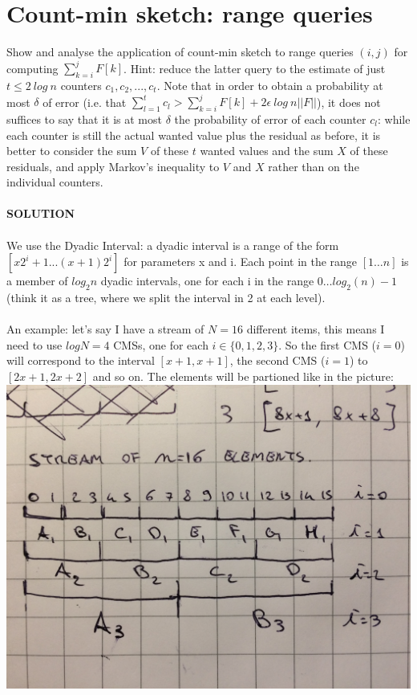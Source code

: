 \documentclass[a4paper]{article}
\begin{document}
\section*{Count-min sketch: range queries}
Show and analyse the application of count-min sketch to range queries $(i,j)$ for computing  $\sum^j_{k=i} F[k]$. Hint: reduce the latter query to the estimate of just $t \leq 2\ log\ n$ counters $c_1,c_2,...,c_t$. Note that in order to obtain a probability at most $\delta$ of error (i.e. that $\sum^t_{l=1}c_l > \sum^j_{k=i}F[k] + 2\epsilon\ log\ n ||F||$), it does not suffices to say that it is at most $\delta$ the probability of error of each counter $c_l$: while each counter is still the actual wanted value plus the residual as before, it is better to consider the sum $V$ of these $t$ wanted values and the sum $X$ of these residuals, and apply Markov's inequality to $V$ and $X$ rather than on the individual counters.
\\
\\
\textbf{SOLUTION}
\\
\\
We use the Dyadic Interval: a dyadic interval is a range of the form $[x2^i+1 . . .(x+1)2^i]$  for parameters x and i. Each point in the range $[1\dots n]$ is a member of $log_2 n$ dyadic intervals, one for each i in the range $0\dots log_2(n) − 1$ (think it as a tree, where we split the interval in 2 at each level).\\\\
An example: let's say I have a stream of $N = 16$ different items, this means I need to use $log N = 4$ CMSs, one for each $i \in \{0,1,2,3\}$. So the first CMS ($i=0$) will correspond to the interval $[x+1, x+1]$, the second CMS ($i=1$) to $[2x+1, 2x+2]$ and so on. The elements will be partioned like in the picture:\\
\includegraphics[scale=.1]{av_tree}\\
\end{document}
